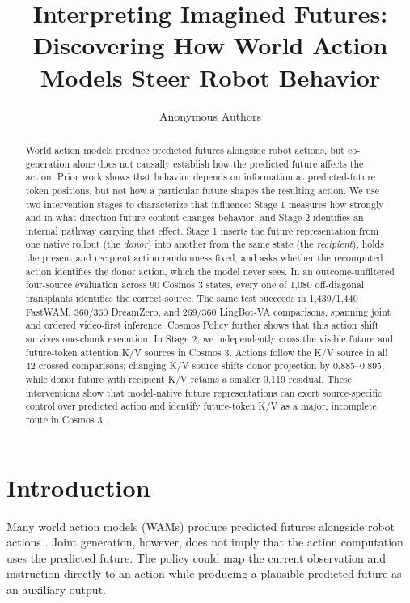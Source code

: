 \documentclass{article}
\title{Interpreting Imagined Futures: Discovering How World Action Models Steer Robot Behavior}
\author{Anonymous Authors}
\begin{document}
\maketitle

\begin{abstract}
World action models produce predicted futures alongside robot actions, but co-generation alone does not causally establish how the predicted future affects the action. Prior work shows that behavior depends on information at predicted-future token positions, but not how a particular future shapes the resulting action. We use two intervention stages to characterize that influence: Stage 1 measures how strongly and in what direction future content changes behavior, and Stage 2 identifies an internal pathway carrying that effect. Stage 1 inserts the future representation from one native rollout (the \emph{donor}) into another from the same state (the \emph{recipient}), holds the present and recipient action randomness fixed, and asks whether the recomputed action identifies the donor action, which the model never sees. In an outcome-unfiltered four-source evaluation across 90 Cosmos 3 states, every one of 1,080 off-diagonal transplants identifies the correct source. The same test succeeds in 1,439/1,440 FastWAM, 360/360 DreamZero, and 269/360 LingBot-VA comparisons, spanning joint and ordered video-first inference. Cosmos Policy further shows that this action shift survives one-chunk execution. In Stage 2, we independently cross the visible future and future-token attention K/V sources in Cosmos 3. Actions follow the K/V source in all 42 crossed comparisons; changing K/V source shifts donor projection by 0.885--0.895, while donor future with recipient K/V retains a smaller 0.119 residual. These interventions show that model-native future representations can exert source-specific control over predicted action and identify future-token K/V as a major, incomplete route in Cosmos 3.
\end{abstract}



\iffalse

\section{Introduction}
\label{sec:introduction}

Many world action models (WAMs) produce predicted futures alongside robot actions \citep{kim2026cosmospolicy,nvidia2026cosmos3}. Joint generation, however, does not imply that the action computation uses the predicted future. The policy could map the current observation and instruction directly to an action while producing a plausible predicted future as an auxiliary output.
\end{document}

